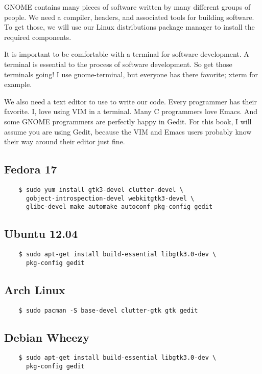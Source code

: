 GNOME contains many pieces of software written by many different groups of
people. We need a compiler, headers, and associated tools for building
software. To get those, we will use our Linux distributions package manager to
install the required components.

It is important to be comfortable with a terminal for software development. A
terminal is essential to the process of software development. So get those
terminals going! I use gnome-terminal, but everyone has there favorite; xterm
for example.

We also need a text editor to use to write our code. Every programmer has their
favorite. I, love using VIM in a terminal. Many C programmers love Emacs. And
some GNOME programmers are perfectly happy in Gedit. For this book, I will
assume you are using Gedit, because the VIM and Emacs users probably know their
way around their editor just fine.


\subsection{Fedora 17}

\begin{Verbatim}
    $ sudo yum install gtk3-devel clutter-devel \
      gobject-introspection-devel webkitgtk3-devel \
      glibc-devel make automake autoconf pkg-config gedit
\end{Verbatim}


\subsection{Ubuntu 12.04}

\begin{Verbatim}
    $ sudo apt-get install build-essential libgtk3.0-dev \
      pkg-config gedit
\end{Verbatim}


\subsection{Arch Linux}
\begin{Verbatim}
    $ sudo pacman -S base-devel clutter-gtk gtk gedit
\end{Verbatim}

\subsection{Debian Wheezy}

\begin{Verbatim}
    $ sudo apt-get install build-essential libgtk3.0-dev \
      pkg-config gedit
\end{Verbatim}


